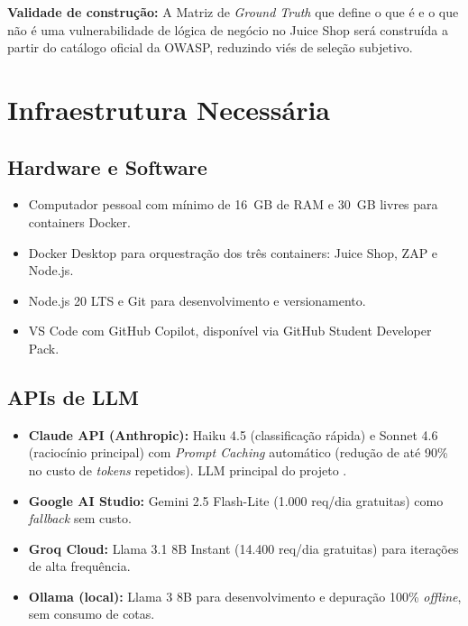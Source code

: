 \documentclass[
    12pt,
    openany,
    oneside,
    a4paper,
    brazil
]{abntex2}
\begin{document}
\textbf{Validade de construção:} A Matriz de \textit{Ground Truth} que
define o que é e o que não é uma vulnerabilidade de lógica de negócio
no Juice Shop será construída a partir do catálogo oficial da OWASP,
reduzindo viés de seleção subjetivo.

\chapter{Infraestrutura Necessária}

\section{Hardware e Software}

\begin{itemize}
  \item Computador pessoal com mínimo de 16~GB de RAM e 30~GB livres
  para containers Docker.
  \item Docker Desktop para orquestração dos três containers: Juice
  Shop, ZAP e Node.js.
  \item Node.js 20 LTS e Git para desenvolvimento e versionamento.
  \item VS Code com GitHub Copilot, disponível via GitHub Student
  Developer Pack.
\end{itemize}

\section{APIs de LLM}

\begin{itemize}
  \item \textbf{Claude API (Anthropic):} Haiku 4.5 (classificação
  rápida) e Sonnet 4.6 (raciocínio principal) com
  \textit{Prompt Caching} automático (redução de até 90\% no custo de
  \textit{tokens} repetidos). LLM principal do projeto
  \cite{anthropicdocs}.

  \item \textbf{Google AI Studio:} Gemini 2.5 Flash-Lite (1.000
  req/dia gratuitas) como \textit{fallback} sem custo.

  \item \textbf{Groq Cloud:} Llama 3.1 8B Instant (14.400 req/dia
  gratuitas) para iterações de alta frequência.

  \item \textbf{Ollama (local):} Llama 3 8B para desenvolvimento e
  depuração 100\% \textit{offline}, sem consumo de cotas.
\end{itemize}
\end{document}
